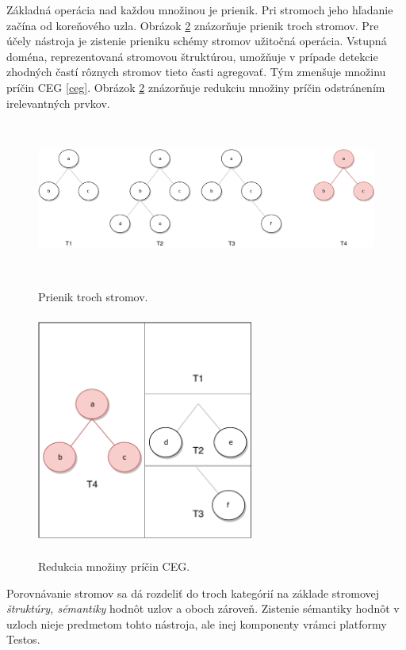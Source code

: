 Základná operácia nad každou množinou je prienik. Pri stromoch jeho hľadanie začína od koreňového uzla. Obrázok \ref{intersection_img} znázorňuje prienik troch stromov. Pre účely nástroja je zistenie prieniku schémy stromov užitočná operácia. Vstupná doména, reprezentovaná stromovou štruktúrou, umožňuje v prípade detekcie zhodných častí rôznych stromov tieto časti agregovať. Tým zmenšuje množinu príčin CEG \ref{ceg}. Obrázok \ref{intersection_img} znázorňuje redukciu množiny príčin odstránením irelevantných prvkov.
\begin{figure}[h]\centering
	\centering
	\includegraphics[width=6.0in,height=2.0in]{obrazky-figures/tree_intersection.pdf}\\[1pt]
	\caption{Prienik troch stromov.}
	\label{intersection_img}
\end{figure} 
\begin{figure}[h]\centering
	\centering
	\includegraphics[width=2.8in,height=3.0in]{obrazky-figures/cause_intersection.pdf}\\[1pt]
	\caption{Redukcia množiny príčin CEG.}
	\label{intersection_img}
\end{figure} 

Porovnávanie stromov sa dá rozdeliť do troch kategórií na základe stromovej \textit{štruktúry, sémantiky} hodnôt uzlov a oboch zároveň. Zistenie sémantiky hodnôt v uzloch nieje predmetom tohto nástroja, ale inej komponenty vrámci platformy Testos.  
